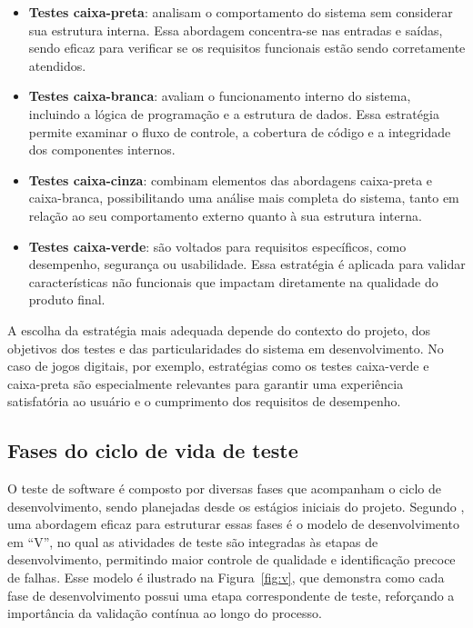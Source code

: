 \begin{itemize}
    \item \textbf{Testes caixa-preta}: analisam o comportamento do sistema sem considerar sua estrutura interna. Essa abordagem concentra-se nas entradas e saídas, sendo eficaz para verificar se os requisitos funcionais estão sendo corretamente atendidos.
    
    \item \textbf{Testes caixa-branca}: avaliam o funcionamento interno do sistema, incluindo a lógica de programação e a estrutura de dados. Essa estratégia permite examinar o fluxo de controle, a cobertura de código e a integridade dos componentes internos.
    
    \item \textbf{Testes caixa-cinza}: combinam elementos das abordagens caixa-preta e caixa-branca, possibilitando uma análise mais completa do sistema, tanto em relação ao seu comportamento externo quanto à sua estrutura interna.
    
    \item \textbf{Testes caixa-verde}: são voltados para requisitos específicos, como desempenho, segurança ou usabilidade. Essa estratégia é aplicada para validar características não funcionais que impactam diretamente na qualidade do produto final.
\end{itemize}

A escolha da estratégia mais adequada depende do contexto do projeto, dos objetivos dos testes e das particularidades do sistema em desenvolvimento. No caso de jogos digitais, por exemplo, estratégias como os testes caixa-verde e caixa-preta são especialmente relevantes para garantir uma experiência satisfatória ao usuário e o cumprimento dos requisitos de desempenho.

\subsection{Fases do ciclo de vida de teste}

O teste de software é composto por diversas fases que acompanham o ciclo de desenvolvimento, sendo planejadas desde os estágios iniciais do projeto. Segundo , uma abordagem eficaz para estruturar essas fases é o modelo de desenvolvimento em “V”, no qual as atividades de teste são integradas às etapas de desenvolvimento, permitindo maior controle de qualidade e identificação precoce de falhas. Esse modelo é ilustrado na Figura~\ref{fig:v}, que demonstra como cada fase de desenvolvimento possui uma etapa correspondente de teste, reforçando a importância da validação contínua ao longo do processo.

